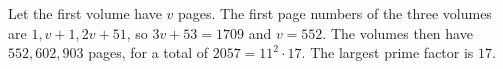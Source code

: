 Let the first volume have $v$ pages. The first page numbers of the three volumes are $1,v+1,2v+51$, so $3v+53=1709$ and $v=552$. The volumes then have $552,602,903$ pages, for a total of $2057=11^2\cdot17$. The largest prime factor is $\boxed{17}$.
